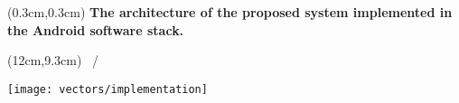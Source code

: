 {\aauwavesbg%
  \begin{textblock*}{5cm}(0.3cm,0.3cm)
  \small
  \textbf{The architecture of the proposed system implemented in the Android software stack.}
  \end{textblock*}
\begin{textblock*}{1cm}(12cm,9.3cm)
  \scriptsize
  \insertframenumber~/~\inserttotalframenumber
  \end{textblock*}
\begin{frame}[plain]
  \centering
  \texttt{[image: vectors/implementation]}
\end{frame}}

